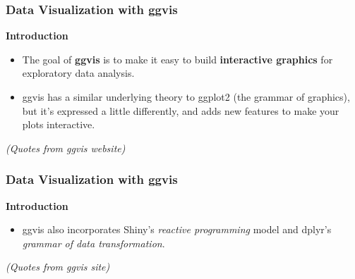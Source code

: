 \documentclass[MASTER.tex]{subfiles}
\begin{document}
 

\begin{frame}
\frametitle{Data Visualization with ggvis}
\Large
\textbf{Introduction}
\begin{itemize}
\item The goal of \textbf{ggvis} is to make it easy to build \textbf{interactive graphics} for exploratory data analysis. 
\item ggvis has a similar underlying theory to ggplot2 (the grammar of graphics), but it’s expressed a little differently, and adds new features to make your plots interactive.
\end{itemize}
\textit{(Quotes from ggvis website)}
\end{frame}


\begin{frame}
	\frametitle{Data Visualization with ggvis}
	\Large
\vspace{-1cm}
	\textbf{Introduction}
	\begin{itemize}
\item  ggvis also incorporates Shiny’s \textit{reactive programming} model and dplyr’s \textit{grammar of data transformation}.
\end{itemize}
\textit{(Quotes from ggvis site)}
\end{frame}
\end{document}

